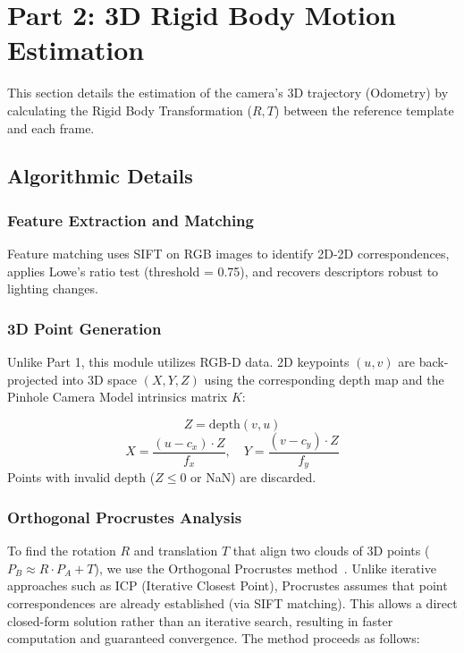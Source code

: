 \documentclass[10pt,twocolumn]{extarticle}
\begin{document}
\section{Part 2: 3D Rigid Body Motion Estimation}

This section details the estimation of the camera's 3D trajectory (Odometry) by calculating the Rigid Body Transformation ($R, T$) between the reference template and each frame.

\subsection{Algorithmic Details}

\subsubsection{Feature Extraction and Matching}
Feature matching uses SIFT on RGB images to identify 2D-2D correspondences, applies Lowe's ratio test (threshold = 0.75), and recovers descriptors robust to lighting changes.

\subsubsection{3D Point Generation}
Unlike Part 1, this module utilizes RGB-D data. 2D keypoints $(u, v)$ are back-projected into 3D space $(X, Y, Z)$ using the corresponding depth map and the Pinhole Camera Model intrinsics matrix $K$:

\begin{equation}
    Z = \text{depth}(v, u)
\end{equation}
\begin{equation}
    X = \frac{(u - c_x) \cdot Z}{f_x}, \quad Y = \frac{(v - c_y) \cdot Z}{f_y}
\end{equation}
Points with invalid depth ($Z \le 0$ or NaN) are discarded.

\subsubsection{Orthogonal Procrustes Analysis}
To find the rotation $R$ and translation $T$ that align two clouds of 3D points ($P_B \approx R \cdot P_A + T$), we use the Orthogonal Procrustes method~\cite{arun1987}. Unlike iterative approaches such as ICP (Iterative Closest Point), Procrustes assumes that point correspondences are already established (via SIFT matching). This allows a direct closed-form solution rather than an iterative search, resulting in faster computation and guaranteed convergence. The method proceeds as follows:
\end{document}
